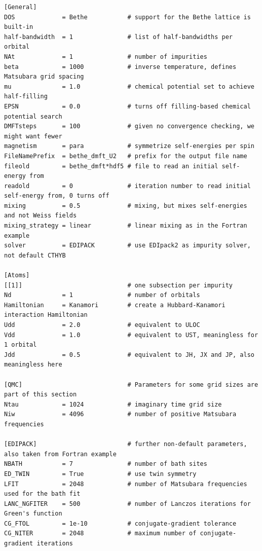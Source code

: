 \documentclass[edipack2.tex]{subfiles}
\begin{document}
\begin{lstlisting}[style=fstyle,language={},numbers=none,basicstyle={\scriptsize\ttfamily}]
[General]
DOS             = Bethe           # support for the Bethe lattice is built-in
half-bandwidth  = 1               # list of half-bandwidths per orbital
NAt             = 1               # number of impurities
beta            = 1000            # inverse temperature, defines Matsubara grid spacing
mu              = 1.0             # chemical potential set to achieve half-filling
EPSN            = 0.0             # turns off filling-based chemical potential search
DMFTsteps       = 100             # given no convergence checking, we might want fewer
magnetism       = para            # symmetrize self-energies per spin
FileNamePrefix  = bethe_dmft_U2   # prefix for the output file name
fileold         = bethe_dmft*hdf5 # file to read an initial self-energy from
readold         = 0               # iteration number to read initial self-energy from, 0 turns off
mixing          = 0.5             # mixing, but mixes self-energies and not Weiss fields
mixing_strategy = linear          # linear mixing as in the Fortran example
solver          = EDIPACK         # use EDIpack2 as impurity solver, not default CTHYB

[Atoms]
[[1]]                             # one subsection per impurity
Nd              = 1               # number of orbitals
Hamiltonian     = Kanamori        # create a Hubbard-Kanamori interaction Hamiltonian
Udd             = 2.0             # equivalent to ULOC
Vdd             = 1.0             # equivalent to UST, meaningless for 1 orbital
Jdd             = 0.5             # equivalent to JH, JX and JP, also meaningless here

[QMC]                             # Parameters for some grid sizes are part of this section
Ntau            = 1024            # imaginary time grid size
Niw             = 4096            # number of positive Matsubara frequencies

[EDIPACK]                         # further non-default parameters, also taken from Fortran example
NBATH           = 7               # number of bath sites
ED_TWIN         = True            # use twin symmetry
LFIT            = 2048            # number of Matsubara frequencies used for the bath fit
LANC_NGFITER    = 500             # number of Lanczos iterations for Green's function
CG_FTOL         = 1e-10           # conjugate-gradient tolerance
CG_NITER        = 2048            # maximum number of conjugate-gradient iterations
\end{lstlisting}
\end{document}

